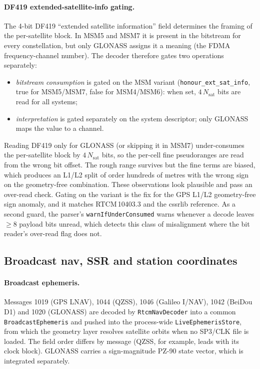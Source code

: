 \documentclass[main.tex]{subfiles}
\begin{document}
\paragraph{DF419 extended-satellite-info gating.}
The 4-bit DF419 ``extended satellite information'' field determines the
framing of the per-satellite block.  In MSM5 and MSM7 it is present in
the bitstream for every constellation, but only GLONASS assigns it a
meaning (the FDMA frequency-channel number).  The decoder therefore
gates two operations separately:
\begin{itemize}[leftmargin=*, itemsep=0pt]
\item \emph{bitstream consumption} is gated on the MSM variant
      (\texttt{honour\_ext\_sat\_info}, true for MSM5/MSM7, false for
      MSM4/MSM6): when set, $4\,N_{\text{sat}}$ bits are read for all
      systems;
\item \emph{interpretation} is gated separately on the system
      descriptor; only GLONASS maps the value to a channel.
\end{itemize}
Reading DF419 only for GLONASS (or skipping it in MSM7) under-consumes
the per-satellite block by $4\,N_{\text{sat}}$ bits, so the per-cell
fine pseudoranges are read from the wrong bit offset.  The rough range
survives but the fine terms are biased, which produces an L1/L2 split of
order hundreds of metres with the wrong sign on the geometry-free
combination.  These observations look plausible and pass an over-read
check.  Gating on the variant is the fix for the GPS L1/L2 geometry-free
sign anomaly, and it matches RTCM\,10403.3 and the cssrlib reference.  As a
second guard, the parser's \texttt{warnIfUnderConsumed} warns whenever a
decode leaves $\ge 8$ payload bits unread, which detects this class of
misalignment where the bit reader's over-read flag does not.

\subsection{Broadcast nav, SSR and station coordinates}\label{sec:rt-other}

\paragraph{Broadcast ephemeris.}
Messages 1019 (GPS LNAV), 1044 (QZSS), 1046 (Galileo I/NAV), 1042
(BeiDou D1) and 1020 (GLONASS) are decoded by \texttt{RtcmNavDecoder}
into a common \texttt{BroadcastEphemeris} and pushed into the
process-wide \texttt{LiveEphemerisStore}, from which the geometry layer
resolves satellite orbits when no SP3/CLK file is loaded.  The field
order differs by message (QZSS, for example, leads with its clock
block).  GLONASS carries a sign-magnitude PZ-90 state vector, which is
integrated separately.
\end{document}
